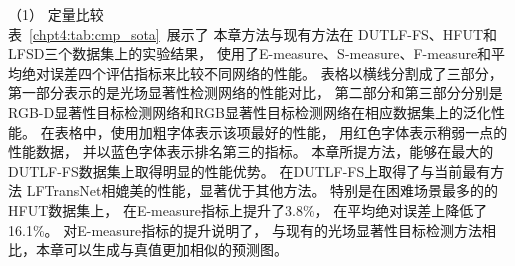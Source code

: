 %
%
%
%
\indent
（1）
定量比较\\
%
%
%
%
\indent
表~\ref{chpt4:tab:cmp_sota}~展示了
本章方法与现有方法在
DUTLF-FS、HFUT和LFSD三个数据集上的实验结果，
使用了E-measure、S-measure、F-measure和平均绝对误差四个评估指标来比较不同网络的性能。
表格以横线分割成了三部分，第一部分表示的是光场显著性检测网络的性能对比，
第二部分和第三部分分别是RGB-D显著性目标检测网络和RGB显著性目标检测网络在相应数据集上的泛化性能。
在表格中，使用加粗字体表示该项最好的性能，
用红色字体表示稍弱一点的性能数据，
并以蓝色字体表示排名第三的指标。
本章所提方法，能够在最大的DUTLF-FS数据集上取得明显的性能优势。
在DUTLF-FS上取得了与当前最有方法
LFTransNet相媲美的性能，显著优于其他方法。
特别是在困难场景最多的的HFUT数据集上，
在E-measure指标上提升了3.8\%，
在平均绝对误差上降低了 16.1\%。
对E-measure指标的提升说明了，
与现有的光场显著性目标检测方法相比，本章可以生成与真值更加相似的预测图。
